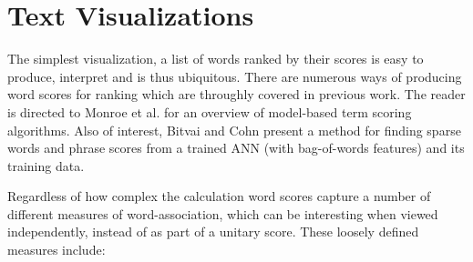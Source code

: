 \documentclass[11pt,a4paper]{article}
\begin{document}
\section{Text Visualizations}
\label{related}
The simplest visualization, a list of words ranked by their scores is easy to produce, interpret and is thus ubiquitous.  There are numerous ways of producing word scores for ranking which are throughly covered in previous work.  The reader is directed to Monroe et al.  for an overview of model-based term scoring algorithms.  Also of interest, Bitvai and Cohn  present a method for finding sparse words and phrase scores from a trained ANN (with bag-of-words features) and its training data. 

Regardless of how complex the calculation word scores capture a number of different measures of word-association, which can be interesting when viewed independently, instead of as part of a unitary score.  These loosely defined measures include:  \vspace{-0.1in}
\end{document}
